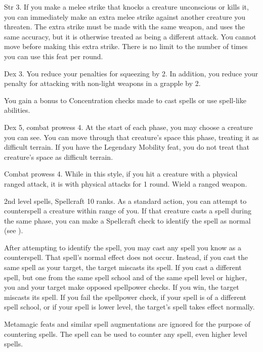 \featpre Str 3.
\featben If you make a melee strike that knocks a creature unconscious or kills it, you can immediately make an extra melee strike against another creature you threaten.
The extra strike must be made with the same weapon, and uses the same accuracy, but it is otherwise treated as being a different attack.
You cannot move before making this extra strike.
There is no limit to the number of times you can use this feat per round.

\featpre Dex 3.
\featben You reduce your penalties for squeezing by 2. In addition, you reduce your penalty for attacking with non-light weapons in a grapple by 2.

\featben You gain a  bonus to Concentration checks made to cast spells or use spell-like abilities.

\featpre Dex 5, combat prowess 4.
\featben At the start of each phase, you may choose a creature you can see.
You can move through that creature's space this phase, treating it as difficult terrain.
 If you have the Legendary Mobility feat, you do not treat that creature's space as difficult terrain.

\featpres Combat prowess 4.
\featben While in this style, if you hit a creature with a physical ranged attack, it is \impaired with physical attacks for 1 round.
\stylereq Wield a ranged weapon.

\featpres 2nd level spells, Spellcraft 10 ranks.
\featben As a standard action, you can attempt to counterspell a creature within \rngmed range of you.
If that creature casts a spell during the same phase, you can make a Spellcraft check to identify the spell as normal (see ).

After attempting to identify the spell, you may cast any spell you know as a counterspell.
That spell's normal effect does not occur.
Instead, if you cast the same spell as your target, the target miscasts its spell.
If you cast a different spell, but one from the same spell school and of the same spell level or higher, you and your target make opposed spellpower checks.
If you win, the target miscasts its spell.
If you fail the spellpower check, if your spell is of a different spell school, or if your spell is lower level, the target's spell takes effect normally.

Metamagic feats and similar spell augmentations are ignored for the purpose of countering spells.
The  spell can be used to counter any spell, even higher level spells.


